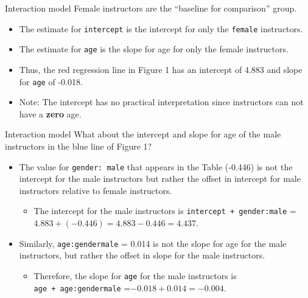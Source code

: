 \documentclass[
  ignorenonframetext,
]{beamer}
\providecommand{\tightlist}{%
  \setlength{\itemsep}{0pt}\setlength{\parskip}{0pt}}
\begin{document}
\begin{frame}[fragile]{Interaction model}
\label{interaction-model-2}
Female instructors are the ``baseline for comparison'' group.

\begin{itemize}
\tightlist
\item
  The estimate for \texttt{intercept} is the intercept for only the
  \texttt{female} instructors.
\item
  The estimate for \texttt{age} is the slope for age for only the female
  instructors.
\item
  Thus, the red regression line in Figure 1 has an intercept of 4.883
  and slope for \texttt{age} of -0.018.
\item
  Note: The intercept has no practical interpretation since instructors
  can not have a \textbf{zero} age.
\end{itemize}
\end{frame}

\begin{frame}[fragile]{Interaction model}
\label{interaction-model-3}
What about the intercept and slope for age of the male instructors in
the blue line of Figure 1?

\begin{itemize}
\item
  The value for \texttt{gender:\ male} that appears in the Table
  (-0.446) is not the intercept for the male instructors but rather the
  offset in intercept for male instructors relative to female
  instructors.

  \begin{itemize}
  \tightlist
  \item
    The intercept for the male instructors is
    \texttt{intercept\ +\ gender:male} =
    \(4.883 + (-0.446) = 4.883 - 0.446 = 4.437\).
  \end{itemize}
\item
  Similarly, \texttt{age:gendermale} = 0.014 is not the slope for age
  for the male instructors, but rather the offset in slope for the male
  instructors.

  \begin{itemize}
  \tightlist
  \item
    Therefore, the slope for \texttt{age} for the male instructors is
    \texttt{age\ +\ age:gendermale} =\(-0.018 + 0.014 = -0.004\).
  \end{itemize}
\end{itemize}
\end{frame}
\end{document}
